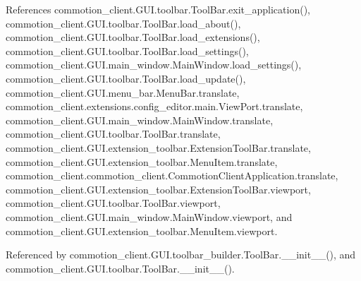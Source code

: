References commotion\+\_\+client.\+G\+U\+I.\+toolbar.\+Tool\+Bar.\+exit\+\_\+application(), commotion\+\_\+client.\+G\+U\+I.\+toolbar.\+Tool\+Bar.\+load\+\_\+about(), commotion\+\_\+client.\+G\+U\+I.\+toolbar.\+Tool\+Bar.\+load\+\_\+extensions(), commotion\+\_\+client.\+G\+U\+I.\+toolbar.\+Tool\+Bar.\+load\+\_\+settings(), commotion\+\_\+client.\+G\+U\+I.\+main\+\_\+window.\+Main\+Window.\+load\+\_\+settings(), commotion\+\_\+client.\+G\+U\+I.\+toolbar.\+Tool\+Bar.\+load\+\_\+update(), commotion\+\_\+client.\+G\+U\+I.\+menu\+\_\+bar.\+Menu\+Bar.\+translate, commotion\+\_\+client.\+extensions.\+config\+\_\+editor.\+main.\+View\+Port.\+translate, commotion\+\_\+client.\+G\+U\+I.\+main\+\_\+window.\+Main\+Window.\+translate, commotion\+\_\+client.\+G\+U\+I.\+toolbar.\+Tool\+Bar.\+translate, commotion\+\_\+client.\+G\+U\+I.\+extension\+\_\+toolbar.\+Extension\+Tool\+Bar.\+translate, commotion\+\_\+client.\+G\+U\+I.\+extension\+\_\+toolbar.\+Menu\+Item.\+translate, commotion\+\_\+client.\+commotion\+\_\+client.\+Commotion\+Client\+Application.\+translate, commotion\+\_\+client.\+G\+U\+I.\+extension\+\_\+toolbar.\+Extension\+Tool\+Bar.\+viewport, commotion\+\_\+client.\+G\+U\+I.\+toolbar.\+Tool\+Bar.\+viewport, commotion\+\_\+client.\+G\+U\+I.\+main\+\_\+window.\+Main\+Window.\+viewport, and commotion\+\_\+client.\+G\+U\+I.\+extension\+\_\+toolbar.\+Menu\+Item.\+viewport.



Referenced by commotion\+\_\+client.\+G\+U\+I.\+toolbar\+\_\+builder.\+Tool\+Bar.\+\_\+\+\_\+init\+\_\+\+\_\+(), and commotion\+\_\+client.\+G\+U\+I.\+toolbar.\+Tool\+Bar.\+\_\+\+\_\+init\+\_\+\+\_\+().


